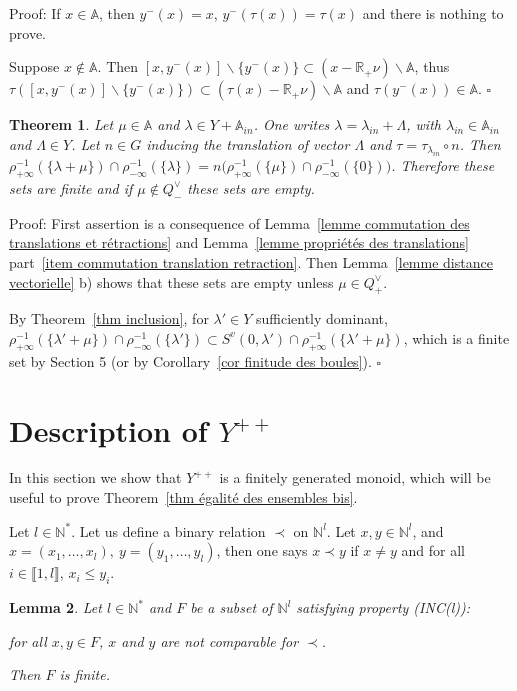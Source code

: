 \documentclass[12pt]{article}
\theoremstyle{plain}
\newtheorem{thm}{Theorem}[section] %
\newtheorem{lemme}[thm]{Lemma}
\theoremstyle{definition}
\newcommand{\R}{\mathbb{R}}
\newcommand{\A}{\mathbb{A}}
\newcommand{\N}{\mathbb{N}}
\newcommand{\Ne}{\mathbb{N}^*}
\begin{document}
Proof: If $x\in \mathbb{A}$, then $y^-(x)=x$, $y^-(\tau(x))=\tau(x)$ and there is nothing to prove. 

Suppose $x\notin \mathbb{A}$. 
Then $[x,y^-(x)]\backslash \{y^-(x)\}\subset (x-\R_+\nu)\backslash \mathbb{A}$,
 thus $\tau([x,y^-(x)]\backslash\{y^-(x)\})\subset (\tau(x)-\R_+\nu)\backslash \mathbb{A}$ and $\tau(y^-(x))\in \mathbb{A}$. $\square$
 




\begin{thm}\label{thm invariance des cardinaux}
Let $\mu\in \A$ and $\lambda\in Y+\A_{in}$. One writes $\lambda=\lambda_{in}+\Lambda$, with $\lambda_{in}\in\A_{in}$ and $\Lambda\in Y$. Let $n\in G$ inducing the translation of vector $\Lambda$ and $\tau=\tau_{\lambda_{in}}\circ n$. Then $\rho_{+\infty}^{-1}(\{\lambda+\mu\})\cap\rho_{-\infty}^{-1}(\{\lambda\})=n\big(\rho_{+\infty}^{-1}(\{\mu\})\cap\rho_{-\infty}^{-1}(\{0\})\big)$. Therefore these sets are finite and if $\mu\notin Q^\vee_-$ these sets are empty.

\end{thm}

Proof: First assertion is a consequence of Lemma~\ref{lemme commutation des translations et rétractions} and Lemma~\ref{lemme propriétés des translations} part~\ref{item commutation translation retraction}. Then Lemma~\ref{lemme distance vectorielle} b) shows that these sets are empty unless $\mu\in Q^\vee_+$. 

By Theorem~\ref{thm inclusion}, for $\lambda'\in Y$ sufficiently dominant, $\rho_{+\infty}^{-1}(\{\lambda'+\mu\})\cap\rho_{-\infty}^{-1}(\{\lambda'\})\subset S^v(0,\lambda')\cap \rho_{+\infty}^{-1}(\{\lambda'+\mu\})$, which is a finite set by \cite{gaussent2014spherical} Section 5 (or by Corollary~\ref{cor finitude des boules}). $\square$








\section{Description of $Y^{++}$}\label{sect Y^++}

In this section we show that $Y^{++}$ is a finitely generated monoid, which will be useful to prove Theorem~\ref{thm égalité des ensembles bis}.



Let $l\in \Ne$. Let us define a binary relation $\prec$ on $\N^l$. Let $x,y\in \N^l$,  and $x=(x_1,\ldots,x_l),\ y=(y_1,\ldots,y_l)$, then one says $x\prec y$ if $x\neq y$ 
and for all $i\in \llbracket 1,l\rrbracket$, $x_i\leq y_i$.
\begin{lemme}\label{lemme ensembles d'incomparables}
Let $l\in \Ne$ and $F$ be a subset of $\N^l$ satisfying property (INC(l)): 

for all $x,y\in F$, $x$ and $y$ are not comparable for $\prec$. 

 Then $F$ is finite.
\end{lemme}
\end{document}
